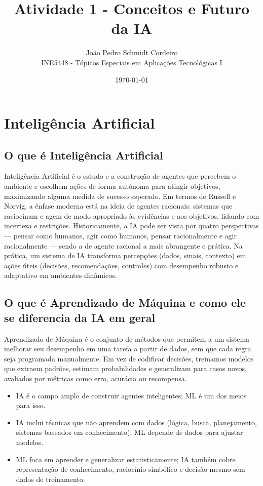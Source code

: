 \documentclass[a4paper,12pt]{article}
\title{Atividade 1 - Conceitos e Futuro da IA}
\author{João Pedro Schmidt Cordeiro \\ INE5448 - Tópicos Especiais em Aplicações Tecnológicas I}
\date{\today}
\begin{document}
\maketitle

\section{Inteligência Artificial}

\subsection{O que é Inteligência Artificial \cite{russell2016}}

Inteligência Artificial é o estudo e a construção de agentes que percebem o ambiente e escolhem ações de forma autônoma para atingir objetivos, maximizando alguma medida de sucesso esperado. Em termos de Russell e Norvig, a ênfase moderna está na ideia de agentes racionais: sistemas que raciocinam e agem de modo apropriado às evidências e aos objetivos, lidando com incerteza e restrições. Historicamente, a IA pode ser vista por quatro perspectivas — pensar como humanos, agir como humanos, pensar racionalmente e agir racionalmente — sendo a de agente racional a mais abrangente e prática. Na prática, um sistema de IA transforma percepções (dados, sinais, contexto) em ações úteis (decisões, recomendações, controles) com desempenho robusto e adaptativo em ambientes dinâmicos.

\subsection{O que é Aprendizado de Máquina e como ele se diferencia da IA em geral \cite{russell2016}}

Aprendizado de Máquina é o conjunto de métodos que permitem a um sistema melhorar seu desempenho em uma tarefa a partir de dados, sem que cada regra seja programada manualmente. Em vez de codificar decisões, treinamos modelos que extraem padrões, estimam probabilidades e generalizam para casos novos, avaliados por métricas como erro, acurácia ou recompensa.

\begin{itemize}
\item IA é o campo amplo de construir agentes inteligentes; ML é um dos meios para isso.
\item IA inclui técnicas que não aprendem com dados (lógica, busca, planejamento, sistemas baseados em conhecimento); ML depende de dados para ajustar modelos.
\item ML foca em aprender e generalizar estatisticamente; IA também cobre representação de conhecimento, raciocínio simbólico e decisão mesmo sem dados de treinamento.
\end{itemize}
\end{document}
